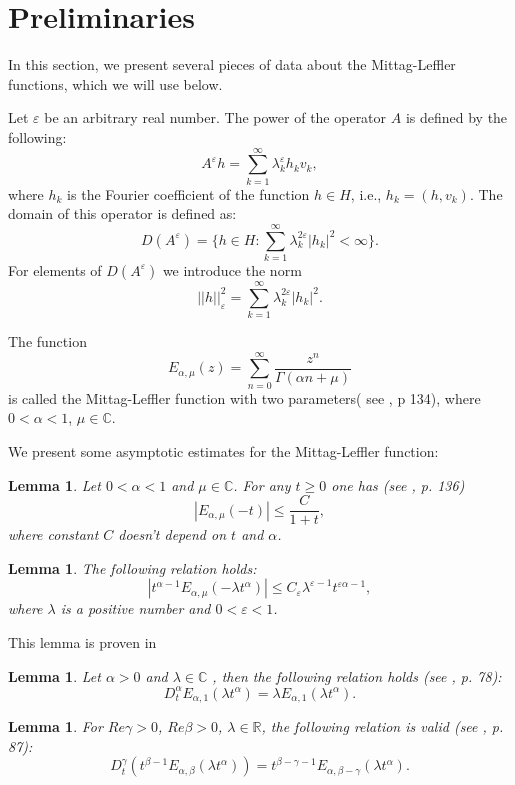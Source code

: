 \documentclass{amsart}
\numberwithin{equation}{section}
\newtheorem{lem}[thm]{Lemma}
\begin{document}
\section{Preliminaries}

In this section, we present several pieces of data about the Mittag-Leffler functions, which we will use below.

 Let $\varepsilon$ be an arbitrary real number. The power of the operator
$A$ is defined by the following:
$$
A^\varepsilon h=\sum_{k=1}^\infty \lambda_k^\varepsilon h_k v_k,
$$
where $h_k$ is the Fourier coefficient of the function $h \in H$, i.e., $h_k=(h,v_k)$. The domain of this operator is defined as:
$$
D(A^\varepsilon)=\{h \in H:\sum_{k=1}^\infty \lambda_k^{2\varepsilon} |h_k|^2<\infty\}.
$$
For elements of $D(A^{\varepsilon})$ we introduce the norm
$$
||h||^2_\varepsilon =\sum\limits_{k=1}^\infty \lambda_k^{2\varepsilon} |h_k|^2.
$$


The function $$E_{\alpha,\mu} (z)=\sum_{n=0}^\infty \frac{z^n}{\Gamma(\alpha n+\mu)}$$  is called the Mittag-Leffler function with two parameters( see \cite{Dzha}, p 134), where  $0<\alpha<1$, $\mu \in \mathbb{C}$.


We present some asymptotic estimates for the Mittag-Leffler function:

\begin{lem}\label{Lemma1}
Let $0<\alpha<1$ and $ \mu \in \mathbb{C}$. For any $t\geq 0$ one has (see \cite{Dzha}, p. 136)
$$
|E_{\alpha, \mu}(-t)|\leq \frac{C}{1+t},
$$
where  constant $C$  doesn't depend on $t$ and $\alpha$.
\end{lem}


\begin{lem}\label{Lemma2}
  The following relation holds:
$$
|t^{\alpha-1}E_{\alpha,\mu}(-\lambda t^\alpha)|\leq C_\varepsilon \lambda^{\varepsilon-1}t^{\varepsilon\alpha-1} ,
$$
where $\lambda$ is a positive number and $0<\varepsilon<1$.
\end{lem}
This lemma is proven in \cite{AshurovFayziev}


\begin{lem}\label{Lemma3}
Let $\alpha>0$ and $\lambda \in \mathbb{C}$ , then the following relation holds (see \cite{Kilbas}, p. 78):
$$D_t^\alpha E_{\alpha,1}(\lambda t^\alpha)=\lambda E_{\alpha,1}(\lambda t^\alpha).$$
\end{lem}

\begin{lem}\label{Lemma4}
For $Re \gamma >0$, $Re \beta >0$, $\lambda \in \mathbb{R}$, the following relation is valid (see \cite{Gor}, p. 87):
$$
    D_t^\gamma\left( t^{\beta-1}E_{\alpha,\beta}(\lambda t^\alpha)\right)=t^{\beta-\gamma-1} E_{\alpha,\beta-\gamma}(\lambda t^\alpha).
$$
\end{lem}
\end{document}
